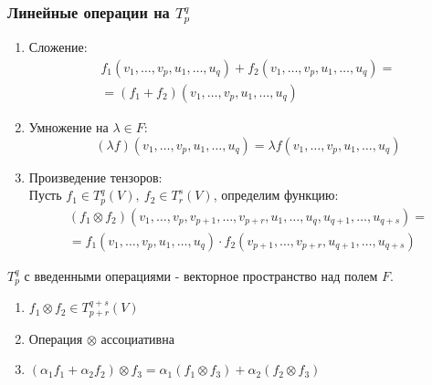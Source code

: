 \subsubsection*{Линейные операции на $T^q_p$}
\begin{enumerate}
    \item Сложение: 
    \begin{multline*}
        f_1(v_1,\dots,v_p,u_1,\dots,u_q)+f_2(v_1,\dots,v_p,u_1,\dots,u_q)=\\
        =(f_1+f_2)(v_1,\dots,v_p,u_1,\dots,u_q)
    \end{multline*}
    \item Умножение на $\lambda\in F$:
    \[(\lambda f)(v_1,\dots,v_p,u_1,\dots,u_q)=\lambda f(v_1,\dots,v_p,u_1,\dots,u_q)\] 
    \item Произведение тензоров:\\
    Пусть $f_1\in T_p^q(V),\ f_2\in T_r^s(V)$, определим функцию:
    \begin{multline*}
        (f_1\otimes f_2)(v_1,\dots,v_p,v_{p+1},\dots,v_{p+r},u_1,\dots,u_q,u_{q+1},\dots,u_{q+s})=\\
        =f_1(v_1,\dots,v_p,u_1,\dots,u_q)\cdot f_2(v_{p+1},\dots,v_{p+r},u_{q+1},\dots,u_{q+s})
    \end{multline*}
\end{enumerate}
\begin{subtheorem}
    $T_p^q$ с введенными операциями - векторное пространство над полем $F$.
\end{subtheorem}
\begin{subtheorem}\tab
    \begin{enumerate}
        \item $f_1\otimes f_2\in T_{p+r}^{q+s}(V)$
        \item Операция $\otimes$ ассоциативна
        \item $(\alpha_1f_1+\alpha_2f_2)\otimes f_3=\alpha_1(f_1\otimes f_3)+\alpha_2(f_2\otimes f_3)$ %
    \end{enumerate}
\end{subtheorem}
